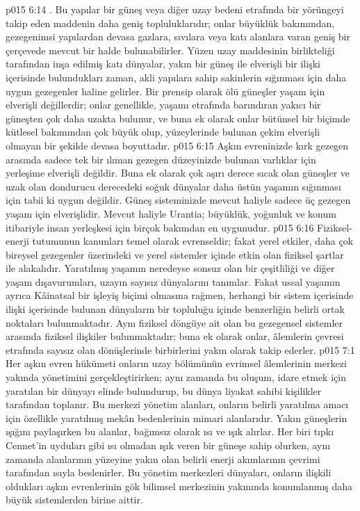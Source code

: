 \vs p015 6:14 . Bu yapılar bir güneş veya diğer uzay bedeni etrafında bir yörüngeyi takip eden maddenin daha geniş topluluklarıdır; onlar büyüklük bakımından, gezegenimsi yapılardan devasa gazlara, sıvılara veya katı alanlara varan geniş bir çerçevede mevcut bir halde bulunabilirler. Yüzen uzay maddesinin birlikteliği tarafından inşa edilmiş katı dünyalar, yakın bir güneş ile elverişli bir ilişki içerisinde bulundukları zaman, akli yapılara sahip sakinlerin sığınması için daha uygun gezegenler haline gelirler. Bir prensip olarak ölü güneşler yaşam için elverişli değillerdir; onlar genellikle, yaşamı etrafında barındıran yakıcı bir güneşten çok daha uzakta bulunur, ve buna ek olarak onlar bütünsel bir biçimde kütlesel bakımından çok büyük olup, yüzeylerinde bulunan çekim elverişli olmayan bir şekilde devasa boyuttadır.
\vs p015 6:15 Aşkın evreninizde kırk gezegen arasında sadece tek bir ılıman gezegen düzeyinizde bulunan varlıklar için yerleşime elverişli değildir. Buna ek olarak çok aşırı derece sıcak olan güneşler ve uzak olan dondurucu derecedeki soğuk dünyalar daha üstün yaşamın sığınması için tabii ki uygun değildir. Güneş sisteminizde mevcut haliyle sadece üç gezegen yaşam için elverişlidir. Mevcut haliyle Urantia; büyüklük, yoğunluk ve konum itibariyle insan yerleşkesi için birçok bakımdan en uygunudur.
\vs p015 6:16 Fiziksel\hyp{}enerji tutumunun kanunları temel olarak evrenseldir; fakat yerel etkiler, daha çok bireysel gezegenler üzerindeki ve yerel sistemler içinde etkin olan fiziksel şartlar ile alakalıdır. Yaratılmış yaşamın neredeyse sonsuz olan bir çeşitliliği ve diğer yaşam dışavurumları, uzayın sayısız dünyalarını tanımlar. Fakat ussal yaşamın ayrıca Kâinatsal bir işleyiş biçimi olmasına rağmen, herhangi bir sistem içerisinde ilişki içerisinde bulunan dünyaların bir topluluğu içinde benzerliğin belirli ortak noktaları bulunmaktadır. Aynı fiziksel döngüye ait olan bu gezegensel sistemler arasında fiziksel ilişkiler bulunmaktadır; buna ek olarak onlar, âlemlerin çevresi etrafında sayısız olan dönüşlerinde birbirlerini yakın olarak takip ederler.
\vs p015 7:1 Her aşkın evren hükümeti onların uzay bölümünün evrimsel âlemlerinin merkezi yakında yönetimini gerçekleştirirken; aynı zamanda bu oluşum, idare etmek için yaratılan bir dünyayı elinde bulundurup, bu dünya liyakat sahibi kişilikler tarafından toplanır. Bu merkezi yönetim alanları, onların belirli yaratılma amacı için özellikle yaratılmış mekân bedenlerinin mimari alanlarıdır. Yakın güneşlerin ışığını paylaşırken bu alanlar, bağımsız olarak ısı ve ışık alırlar. Her biri tıpkı Cennet’in uyduları gibi ısı olmadan ışık veren bir güneşe sahip olurken, aynı zamanda alanlarının yüzeyine yakın olan belirli enerji akımlarının çevrimi tarafından ısıyla beslenirler. Bu yönetim merkezleri dünyaları, onların ilişkili oldukları aşkın evrenlerinin gök bilimsel merkezinin yakınında konumlanmış daha büyük sistemlerden birine aittir.
